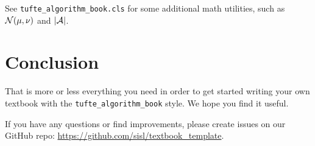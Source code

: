 See \texttt{tufte\_algorithm\_book.cls} for some additional math utilities, such as $\mathcal{N}(\mu, \nu)$ and $\lvert\mathcal{A}\rvert$.

\section{Conclusion}

That is more or less everything you need in order to get started writing your own textbook with the \texttt{tufte\_algorithm\_book} style.
We hope you find it useful.

If you have any questions or find improvements, please create issues on our GitHub repo: \url{https://github.com/sisl/textbook_template}.